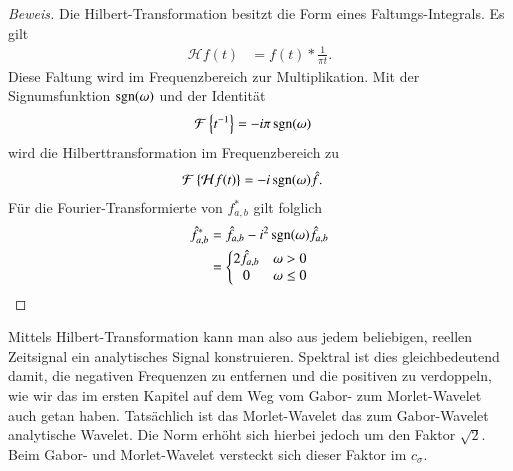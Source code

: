 \begin{proof}[Beweis]
	Die Hilbert-Transformation besitzt die Form eines Faltungs-Integrals.
	Es gilt
	\begin{align*}
		\mathcal{H} f(t) &= f(t) * \frac{1}{\pi t}.
	\end{align*}
	Diese Faltung wird im Frequenzbereich zur Multiplikation.
	Mit der Signumsfunktion $\sgn(\omega)$ und der Identität
	\begin{align*}
		\mathcal{F} \left\lbrace t^{-1}\right\rbrace  &= -i\pi\sgn(\omega)
	\end{align*}
	wird die Hilberttransformation im Frequenzbereich zu
	\begin{align*}
		\mathcal{F}\left\lbrace \mathcal{H}f(t)\right\rbrace 
		&= -i\sgn(\omega) \hat{f}.
	\end{align*}
	Für die Fourier-Transformierte von $f^\ast_{a,b}$ gilt folglich 
	\begin{align*}
		\hat{f}^\ast_{a,b} 
		&= \hat{f}_{a,b} - i^2\sgn(\omega)\hat{f}_{a,b}\\
		&=\left\lbrace\begin{matrix}
			2\hat{f}_{a,b} & \omega > 0\\
			0 & \omega \le 0
		\end{matrix} \right.
	\end{align*}
\end{proof}

Mittels Hilbert-Transformation kann man also aus jedem beliebigen, reellen Zeitsignal ein analytisches Signal konstruieren.
Spektral ist dies gleichbedeutend damit, die negativen Frequenzen zu entfernen und die positiven zu verdoppeln, wie wir das im ersten Kapitel auf dem Weg vom Gabor- zum Morlet-Wavelet auch getan haben.
Tatsächlich ist das Morlet-Wavelet das zum Gabor-Wavelet analytische Wavelet.
Die Norm erhöht sich hierbei jedoch um den Faktor $\sqrt{2}$.
Beim Gabor- und Morlet-Wavelet versteckt sich dieser Faktor im $c_\sigma$.
